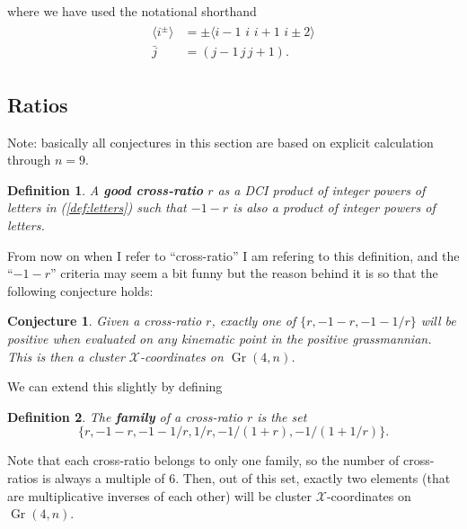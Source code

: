 \documentclass[12pt]{article}
\DeclareMathOperator{\Gr}{Gr}
\def\ket#1{\langle #1 \rangle}
\newtheorem{definition}{Definition}
\newtheorem{conjecture}{Conjecture}
\begin{document}
where we have used the notational shorthand
\begin{align}
\begin{split}
\ket{i^{\pm}}&=\pm\ket{i-1\,\,i\,\,i+1\,\,i\pm2}\\
\bar{j}&=(j-1\,j\,j+1).
\end{split}
\end{align}

\subsection*{Ratios}

Note: basically all conjectures in this section are based on explicit calculation through $n=9$.

\begin{definition} 
A \textbf{good cross-ratio} $r$ as a DCI product of integer powers of letters in (\ref{def:letters}) such that $-1-r$ is also a product of integer powers of letters. 
\end{definition}

From now on when I refer to ``cross-ratio'' I am refering to this definition, and the ``$-1-r$'' criteria may seem a bit funny but the reason behind it is so that the following conjecture holds:
\begin{conjecture}
Given a cross-ratio $r$, exactly one of $\{r,-1-r,-1-1/r\}$ will be positive when evaluated on any kinematic point in the positive grassmannian. This is then a cluster $\mathcal{X}$-coordinates on $\Gr(4,n)$.
\end{conjecture}
We can extend this slightly by defining
\begin{definition}
The \textbf{family} of a cross-ratio $r$ is the set
\begin{equation}
\{ r, -1 - r, -1 - 1/r, 1/r, -1/(1+r), -1/(1+1/r) \}.
\end{equation}
\end{definition}
Note that each cross-ratio belongs to only one family, so the number of cross-ratios is always a multiple of 6. Then, out of this set, exactly two elements (that are multiplicative inverses of each other) will be cluster $\mathcal{X}$-coordinates on $\Gr(4,n)$. 
\end{document}
